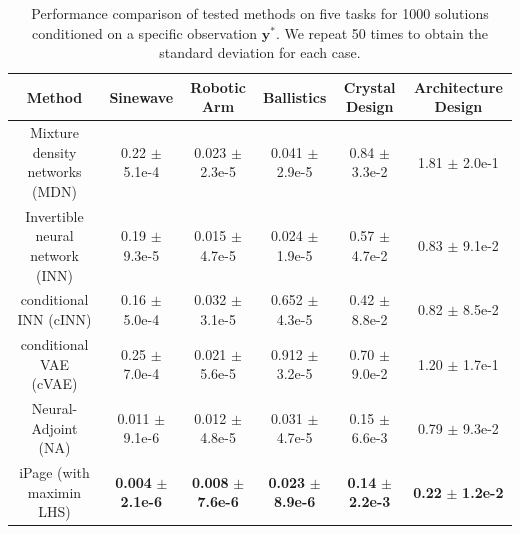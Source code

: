 \documentclass[letterpaper]{article} %
\begin{document}
\begin{table}[!h]
\footnotesize
\centering
\caption{Performance comparison of tested methods on five tasks for 1000 solutions conditioned on a specific observation $\mathbf{y}^*$. We repeat 50 times to obtain the standard deviation for each case.}
\label{tab:1_y}
\begin{tabular}{@{}cccccc@{}}
\toprule
Method & Sinewave     & Robotic Arm     & Ballistics     & Crystal Design  & Architecture Design \\ \midrule
Mixture density networks (MDN)    & 0.22 $\pm$ 5.1e-4 & 0.023 $\pm$ 2.3e-5  & 0.041 $\pm$ 2.9e-5 & 0.84 $\pm$ 3.3e-2   & 1.81 $\pm$ 2.0e-1\\
Invertible neural network (INN)    & 0.19 $\pm$ 9.3e-5  & 0.015 $\pm$ 4.7e-5  & {0.024} $\pm$ 1.9e-5 & 0.57 $\pm$ 4.7e-2  & 0.83 $\pm$ 9.1e-2 \\
conditional INN (cINN)   & 0.16 $\pm$ 5.0e-4  & 0.032 $\pm$ 3.1e-5   & 0.652 $\pm$ 4.3e-5   & 0.42 $\pm$ 8.8e-2 & 0.82 $\pm$ 8.5e-2   \\
conditional VAE (cVAE)   & 0.25 $\pm$ 7.0e-4  & 0.021 $\pm$ 5.6e-5   & 0.912 $\pm$ 3.2e-5   & 0.70 $\pm$ 9.0e-2  & 1.20 $\pm$ 1.7e-1 \\
Neural-Adjoint (NA)     & 0.011 $\pm$ 9.1e-6 & 0.012 $\pm$ 4.8e-5  & 0.031 $\pm$ 4.7e-5   & {0.15} $\pm$ 6.6e-3  & 0.79 $\pm$ 9.3e-2 \\ \midrule
iPage (with maximin LHS) & {\bf 0.004} $\pm$ {\bf 2.1e-6} & {\bf0.008} $\pm$ {\bf7.6e-6}  & {\bf 0.023} $\pm$ {\bf 8.9e-6}   & {\bf0.14} $\pm$ {\bf 2.2e-3}  & {\bf 0.22} $\pm$ {\bf 1.2e-2}  \\ \bottomrule
\end{tabular}
\end{table}
\end{document}
